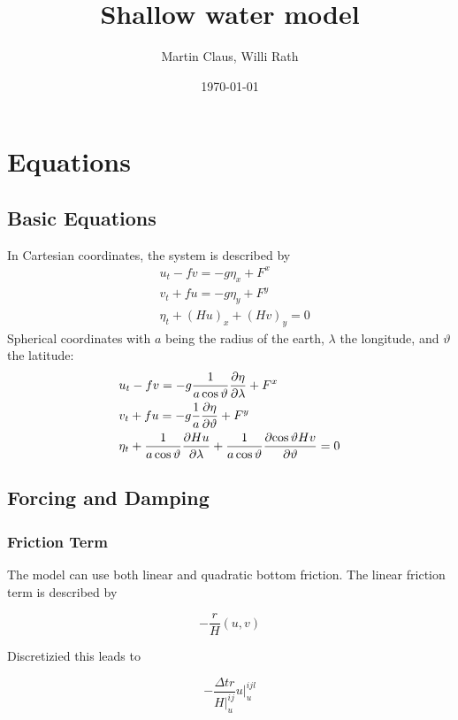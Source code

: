 \documentclass[a4paper]{article}
\title{Shallow water model}
\author{Martin Claus, Willi Rath}
\date{\today}
\begin{document}
\maketitle


\section{Equations}
\subsection{Basic Equations}
In Cartesian coordinates, the system is described by
\begin{align}
  & u_t - fv = -g \eta_x + F^x \\
  & v_t + fu = -g \eta_y + F^y \\
  & \eta_t + (Hu)_x + (Hv)_y = 0
\end{align}
Spherical coordinates with $a$ being the radius of the earth, $\lambda$ the 
longitude, and $\vartheta$ the latitude:
\begin{align}
  & u_t - fv = -g \frac{1}{a\cos\vartheta}\frac{\partial {\eta}}{\partial {\lambda}} + F^x \\
  & v_t + fu = -g \frac{1}{a}\frac{\partial {\eta}}{\partial {\vartheta}} + F^y \\
  & \eta_t + \frac{1}{a\cos\vartheta}\frac{\partial {Hu}}{\partial {\lambda}} + \frac{1}{a\cos\vartheta}\frac{\partial {\cos\vartheta Hv}}{\partial {\vartheta}} = 0
\end{align}
\subsection{Forcing and Damping}
\subsubsection{Friction Term}

The model can use both linear and quadratic bottom friction.
The linear friction term is described by

\begin{equation}
  -\frac rH (u,v)
\end{equation}

Discretizied this leads to

\begin{equation}
  -\frac {\Delta tr}{H\vert^{ij}_u} u\vert^{ijl}_u
\end{equation}
\end{document}
